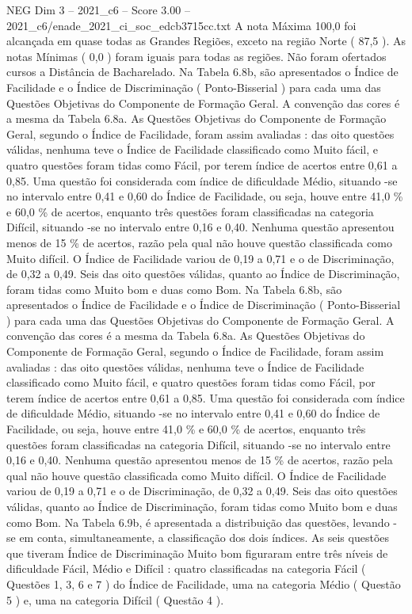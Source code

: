 \begin{textsample}{NEG Dim 3 – 2021\_c6 – Score 3.00 – 2021\_c6/enade\_2021\_ci\_soc\_edcb3715cc.txt}
A nota Máxima 100,0 foi alcançada em quase todas as Grandes Regiões, exceto na região Norte ( 87,5 ).
As notas Mínimas ( 0,0 ) foram iguais para todas as regiões.
Não foram ofertados cursos a Distância de Bacharelado.
Na Tabela 6.8b, são apresentados o Índice de Facilidade e o Índice de Discriminação ( Ponto-Bisserial ) para cada uma das Questões Objetivas do Componente de Formação Geral.
A convenção das cores é a mesma da Tabela 6.8a.
As Questões Objetivas do Componente de Formação Geral, segundo o Índice de Facilidade, foram assim avaliadas : das oito questões válidas, nenhuma teve o Índice de Facilidade classificado como Muito fácil, e quatro questões foram tidas como Fácil, por terem índice de acertos entre 0,61 a 0,85.
Uma questão foi considerada com índice de dificuldade Médio, situando -se no intervalo entre 0,41 e 0,60 do Índice de Facilidade, ou seja, houve entre 41,0 \% e 60,0 \% de acertos, enquanto três questões foram classificadas na categoria Difícil, situando -se no intervalo entre 0,16 e 0,40.
Nenhuma questão apresentou menos de 15 \% de acertos, razão pela qual não houve questão classificada como Muito difícil.
O Índice de Facilidade variou de 0,19 a 0,71 e o de Discriminação, de 0,32 a 0,49.
Seis das oito questões válidas, quanto ao Índice de Discriminação, foram tidas como Muito bom e duas como Bom.
Na Tabela 6.8b, são apresentados o Índice de Facilidade e o Índice de Discriminação ( Ponto-Bisserial ) para cada uma das Questões Objetivas do Componente de Formação Geral.
A convenção das cores é a mesma da Tabela 6.8a.
As Questões Objetivas do Componente de Formação Geral, segundo o Índice de Facilidade, foram assim avaliadas : das oito questões válidas, nenhuma teve o Índice de Facilidade classificado como Muito fácil, e quatro questões foram tidas como Fácil, por terem índice de acertos entre 0,61 a 0,85.
Uma questão foi considerada com índice de dificuldade Médio, situando -se no intervalo entre 0,41 e 0,60 do Índice de Facilidade, ou seja, houve entre 41,0 \% e 60,0 \% de acertos, enquanto três questões foram classificadas na categoria Difícil, situando -se no intervalo entre 0,16 e 0,40.
Nenhuma questão apresentou menos de 15 \% de acertos, razão pela qual não houve questão classificada como Muito difícil.
O Índice de Facilidade variou de 0,19 a 0,71 e o de Discriminação, de 0,32 a 0,49.
Seis das oito questões válidas, quanto ao Índice de Discriminação, foram tidas como Muito bom e duas como Bom.
Na Tabela 6.9b, é apresentada a distribuição das questões, levando -se em conta, simultaneamente, a classificação dos dois índices.
As seis questões que tiveram Índice de Discriminação Muito bom figuraram entre três níveis de dificuldade Fácil, Médio e Difícil : quatro classificadas na categoria Fácil ( Questões 1, 3, 6 e 7 ) do Índice de Facilidade, uma na categoria Médio ( Questão 5 ) e, uma na categoria Difícil ( Questão 4 ).

\end{textsample}
